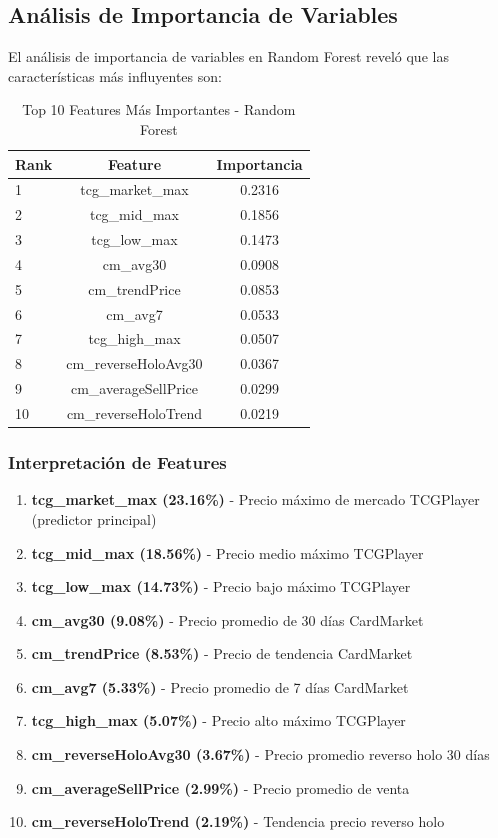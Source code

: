 \documentclass[12pt,letterpaper]{article}
\begin{document}
\subsection{Análisis de Importancia de Variables}

El análisis de importancia de variables en Random Forest reveló que las características más influyentes son:

\begin{table}[H]
\centering
\caption{Top 10 Features Más Importantes - Random Forest}
\begin{tabular}{@{}lcc@{}}
\toprule
\textbf{Rank} & \textbf{Feature} & \textbf{Importancia} \\
\midrule
1 & tcg\_market\_max & 0.2316 \\
2 & tcg\_mid\_max & 0.1856 \\
3 & tcg\_low\_max & 0.1473 \\
4 & cm\_avg30 & 0.0908 \\
5 & cm\_trendPrice & 0.0853 \\
6 & cm\_avg7 & 0.0533 \\
7 & tcg\_high\_max & 0.0507 \\
8 & cm\_reverseHoloAvg30 & 0.0367 \\
9 & cm\_averageSellPrice & 0.0299 \\
10 & cm\_reverseHoloTrend & 0.0219 \\
\bottomrule
\end{tabular}
\label{tab:importancia_features}
\end{table}

\subsubsection{Interpretación de Features}

\begin{enumerate}
    \item \textbf{tcg\_market\_max (23.16\%)} - Precio máximo de mercado TCGPlayer (predictor principal)
    \item \textbf{tcg\_mid\_max (18.56\%)} - Precio medio máximo TCGPlayer
    \item \textbf{tcg\_low\_max (14.73\%)} - Precio bajo máximo TCGPlayer
    \item \textbf{cm\_avg30 (9.08\%)} - Precio promedio de 30 días CardMarket
    \item \textbf{cm\_trendPrice (8.53\%)} - Precio de tendencia CardMarket
    \item \textbf{cm\_avg7 (5.33\%)} - Precio promedio de 7 días CardMarket
    \item \textbf{tcg\_high\_max (5.07\%)} - Precio alto máximo TCGPlayer
    \item \textbf{cm\_reverseHoloAvg30 (3.67\%)} - Precio promedio reverso holo 30 días
    \item \textbf{cm\_averageSellPrice (2.99\%)} - Precio promedio de venta
    \item \textbf{cm\_reverseHoloTrend (2.19\%)} - Tendencia precio reverso holo
\end{enumerate}
\end{document}
